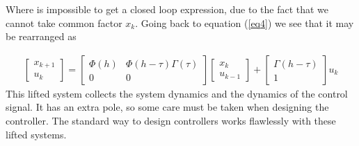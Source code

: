 \documentclass[nols]{tufte-handout}
\theoremstyle{definition}
\begin{document}
Where is impossible to get a closed loop expression, due to the fact that we cannot take common factor $x_k$. Going back to equation (\ref{eq4}) we see that it may be rearranged as 


\begin{align}\label{eq6}
    \begin{bmatrix}
        x_{k+1}\\
        u_{k}
    \end{bmatrix}=
    \begin{bmatrix}
        \Phi(h) & \Phi(h-\tau) \Gamma(\tau)\\
        0 & 0
    \end{bmatrix}
    \begin{bmatrix}
        x_{k}\\
        u_{k-1}
    \end{bmatrix}+
    \begin{bmatrix}
         \Gamma(h-\tau)\\
         1
    \end{bmatrix}u_k
\end{align}
This lifted system collects the system dynamics and the dynamics of the control signal. It has an extra pole, so some care must be taken when designing the controller. The standard way to design controllers works flawlessly with these lifted systems.
\end{document}
